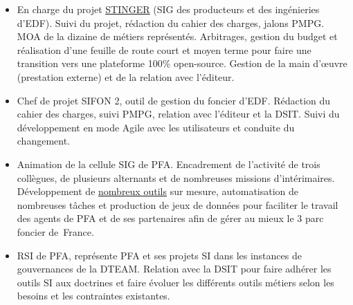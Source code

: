 \documentclass[9pt,a4paper,ragged2e,withhyper]{altacv}
\begin{document}

\begin{paracol}{2}


\begin{itemize}
\item En charge du projet \underline{\href{https://stinger.edf.fr/}{STINGER}} (SIG des producteurs et des ingénieries d'EDF). Suivi du projet, rédaction du cahier des charges, jalons PMPG. MOA de la dizaine de métiers représentés. Arbitrages, gestion du budget et réalisation d'une feuille de route court et moyen terme pour faire une transition vers une plateforme 100\% open-source. Gestion de la main d'œuvre (prestation externe) et de la relation avec l'éditeur.
\item Chef de projet SIFON 2, outil de gestion du foncier d'EDF. Rédaction du cahier des charges, suivi PMPG, relation
avec l'éditeur et la DSIT. Suivi du développement en mode Agile avec les utilisateurs et conduite du changement. 
\item Animation de la cellule SIG de PFA. Encadrement de l'activité de trois collègues, de plusieurs alternants et de nombreuses missions d'intérimaires. Développement de \underline{\href{https://stinger.edf.fr/pfa/}{nombreux outils}} sur mesure, automatisation de nombreuses tâches et production de jeux de données pour faciliter le travail des agents de PFA et de ses partenaires afin de gérer au mieux le 3 parc foncier de~France.
\item RSI de PFA, représente PFA et ses projets SI dans les instances de gouvernances de la DTEAM. Relation avec la DSIT pour faire adhérer les outils SI aux doctrines et faire évoluer les différents outils métiers selon les besoins et les contraintes existantes.
\end{itemize}



\end{paracol}
\end{document}
